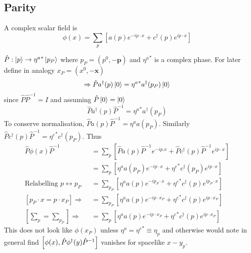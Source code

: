 \documentclass{article}
\begin{document}
\subsection{Parity}

\begin{definition}
A complex scalar field is 
\[
\phi(x) = \sum_p \left[ a(p) e^{-ip\cdot x} + c^\dagger(p) e^{ip\cdot x} \right]
\]
\end{definition}
$\hat{P}: \ket{p} \to {\eta^a}^\ast \ket{p_P}$ where $p_P = (p^0,-\bm{p})$ and ${\eta^a}^\ast$ is a complex phase. For later define in analogy $x_P = (x^0, -\bm{x})$
\[
\Rightarrow \hat{P} a^\dagger (p) \ket{0} = {\eta^a}^\ast a^\dagger (p_P) \ket{0}
\]
since $\hat{P}\hat{P}^{-1}=I$ and assuming $\hat{P}\ket{0}=\ket{0}$
\[
\hat{P} a^\dagger (p) \hat{P}^{-1} = {\eta^a}^\ast a^\dagger (p_P)
\]
To conserve normalisation, $\hat{P} a(p) \hat{P}^{-1} = \eta^{a} a(p_P)$. Similarly $\hat{P} c^\dagger(p) \hat{P}^{-1} = {\eta^c}^\ast c^\dagger(p_P)$. Thus 
\begin{align*}
\hat{P} \phi(x) \hat{P}^{-1} &= \sum_p \left[ \hat{P} a(p) \hat{P}^{-1} e^{-ip.x} + \hat{P} c^\dagger(p) \hat{P}^{-1} e^{ip\cdot x} \right] \\ 
&= \sum_p \left[ \eta^a a(p_P) e^{-ip\cdot x} + {\eta^c}^\ast c^\dagger(p_P) e^{ip\cdot x} \right] \\
\text{Relabelling $p \leftrightarrow p_P$ } &= \sum_{p_P} \left[ \eta^a a(p) e^{-ip_P\cdot x} + {\eta^c}^\ast c^\dagger(p) e^{ip_P \cdot x} \right] \\
[p_P \cdot x = p\cdot x_P] \Rightarrow &= \sum_{p_P} \left[ \eta^a a(p) e^{-ip\cdot x_P} + {\eta^c}^\ast c^\dagger(p) e^{ip \cdot x_P} \right]  \\
[\sum_p = \sum_{p_P}] \Rightarrow &= \sum_{p} \left[ \eta^a a(p) e^{-ip\cdot x_P} + {\eta^c}^\ast c^\dagger(p) e^{ip \cdot x_P} \right] 
\end{align*}
This does not look like $\phi(x_P)$ unless $\eta^a = {\eta^c}^\ast \equiv \eta_p$ and otherwise would note in general find $\comm[\phi(x)]{\hat{P}\phi^\dagger(y) \hat{P}^{-1}}$ vanishes for spacelike $x-y_p$. 

 
\end{document}
